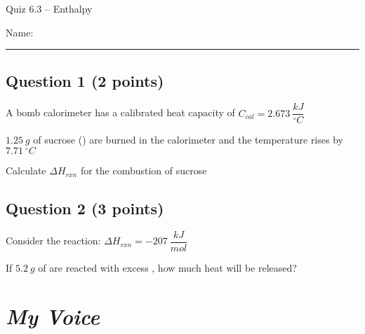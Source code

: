 \documentclass[11pt, letterpaper]{memoir}
\begin{document}
	\begin{center}
		{\large	Quiz 6.3 -- Enthalpy}
	\end{center}
{\large Name: \rule[-1mm]{4in}{.1pt}
	
	\subsection*{Question 1 (2 points)}
	A bomb calorimeter has a calibrated heat capacity of $C_{cal}=2.673~\dfrac{kJ}{^\circ C}$
	
	\noindent
	$1.25~g$ of sucrose () are burned in the calorimeter and the temperature rises by $7.71~^\circ C$
	
	\noindent
	Calculate $\Delta H_{rxn}$ for the combustion of sucrose
	
	
	\vspace{15em}
	\subsection*{Question 2 (3 points)}
	Consider the reaction:  \hspace{2em} $\Delta H_{rxn} = -207~\dfrac{kJ}{mol}$
	
	\noindent
	If $5.2~g$ of  are reacted with excess , how much heat will be released?

\newpage
\pagestyle{empty}
\addtocounter{page}{-1}
\section*{\emph{My Voice}}
}
\end{document}
